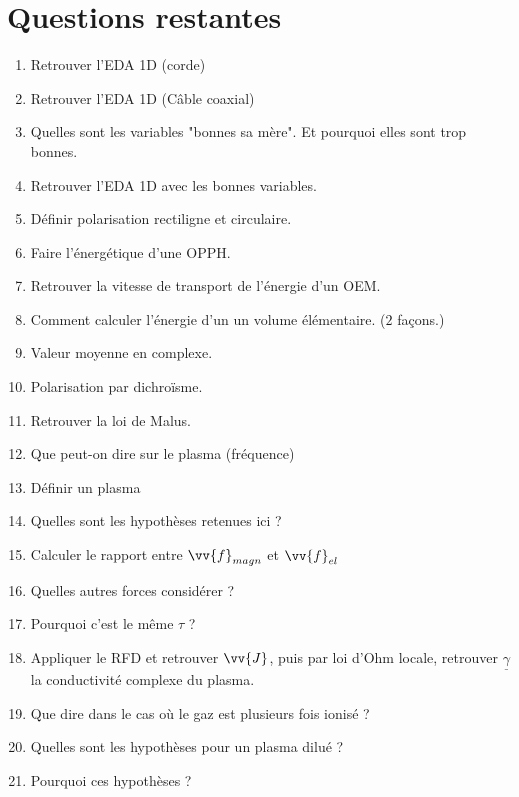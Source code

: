 \documentclass[a4paper, 11pt, hidelinks]{article}
\begin{document}
\section{Questions restantes}
\begin{enumerate}
    \item Retrouver l'EDA 1D (corde) \cite{Chapitre15}
    \item Retrouver l'EDA 1D (Câble coaxial) \cite{Chapitre15}
    \item Quelles sont les variables "bonnes sa mère". Et pourquoi elles sont trop bonnes. \cite{Chapitre15}
    \item Retrouver l'EDA 1D avec les bonnes variables. \cite{Chapitre15}
    \item Définir polarisation rectiligne et circulaire. \cite{Chapitre15}
    \item Faire l'énergétique d'une OPPH. \cite{Chapitre15}
    \item Retrouver la vitesse de transport de l'énergie d'un OEM. \cite{Chapitre15}
    \item Comment calculer l'énergie d'un un volume élémentaire. ($2$ façons.) \cite{Chapitre15}
    \item Valeur moyenne en complexe. \cite{Chapitre15}
    \item Polarisation par dichroïsme. \cite{Chapitre15}
    \item Retrouver la loi de Malus. \cite{Chapitre15}
    \item Que peut-on dire sur le plasma (fréquence) \cite{Chapitre16}
    \item Définir un plasma \cite{Chapitre16}
    \item Quelles sont les hypothèses retenues ici ? \cite{Chapitre16}
    \item Calculer le rapport entre $\vv{f}_{magn}$ et $\vv{f}_{el}$ \cite{Chapitre16}
    \item Quelles autres forces considérer ? \cite{Chapitre16}
    \item Pourquoi c'est le même $\tau$ ? \cite{Chapitre16}
    \item Appliquer le RFD et retrouver $\vv{J}$, puis par loi d'Ohm locale, retrouver $\underline{\gamma}$ la conductivité complexe du plasma. \cite{Chapitre16}
    \item Que dire dans le cas où le gaz est plusieurs fois ionisé ? \cite{Chapitre16}
    \item Quelles sont les hypothèses pour un plasma dilué ? \cite{Chapitre16}
    \item Pourquoi ces hypothèses ? \cite{Chapitre16}

\end{enumerate}
\end{document}
